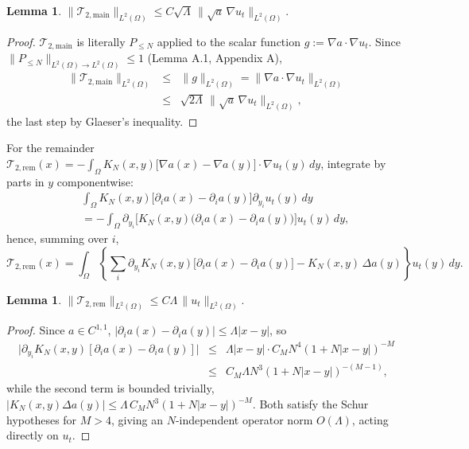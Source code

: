 \documentclass[11pt,letterpaper]{amsart}
\newtheorem{lemma}[theorem]{Lemma}
\newcommand{\Om}{\Omega}
\begin{document}
\begin{lemma}\label{lem:T2main}
$\displaystyle \|\mathcal T_{2,\mathrm{main}}\|_{L^2(\Om)} \le C\sqrt{\Lambda}\,\|\sqrt{a}\,\nabla u_t\|_{L^2(\Om)}.$
\end{lemma}
\begin{proof}
$\mathcal T_{2,\mathrm{main}}$ is literally $P_{\le N}$ applied to the scalar function $g:=\nabla a\cdot\nabla u_t$. Since $\|P_{\le N}\|_{L^2(\Om)\to L^2(\Om)}\le 1$ (Lemma A.1, Appendix A),
\begin{eqnarray*}
\|\mathcal T_{2,\mathrm{main}}\|_{L^2(\Om)} &\le& \|g\|_{L^2(\Om)} = \|\nabla a\cdot \nabla u_t\|_{L^2(\Om)}\\ 
&\le& \sqrt{2\Lambda}\,\|\sqrt{a}\,\nabla u_t\|_{L^2(\Om)},
\end{eqnarray*}
the last step by Glaeser's inequality.
\end{proof}

\noindent For the remainder $\mathcal T_{2,\mathrm{rem}}(x) = -\int_\Om K_N(x,y)\big[\nabla a(x)-\nabla a(y)\big]\cdot\nabla u_t(y)\,dy$, integrate by parts in $y$ componentwise:
\begin{eqnarray*}
&&\int_\Om K_N(x,y)\big[\partial_ia(x)-\partial_ia(y)\big]\partial_{y_i}u_t(y)\,dy\\
&& = -\int_\Om \partial_{y_i}\Big[K_N(x,y)\big(\partial_ia(x)-\partial_ia(y)\big)\Big]u_t(y)\,dy,
\end{eqnarray*}
hence, summing over $i$,
\[
\mathcal T_{2,\mathrm{rem}}(x) = \int_\Om \left\{\sum_i\partial_{y_i}K_N(x,y)\big[\partial_ia(x)-\partial_ia(y)\big] - K_N(x,y)\,\Delta a(y)\right\} u_t(y)\,dy.
\]

\begin{lemma}\label{lem:T2rem}
$\displaystyle \|\mathcal T_{2,\mathrm{rem}}\|_{L^2(\Om)} \le C\Lambda\,\|u_t\|_{L^2(\Om)}.$
\end{lemma}
\begin{proof}
Since $a\in C^{1,1}$, $|\partial_ia(x)-\partial_ia(y)|\le\Lambda|x-y|$, so
\begin{eqnarray*}
\big|\partial_{y_i}K_N(x,y)[\partial_ia(x)-\partial_ia(y)]\big| &\le& \Lambda|x-y|\cdot C_MN^4(1+N|x-y|)^{-M}\\ 
&\le& C_M\Lambda N^3(1+N|x-y|)^{-(M-1)},
\end{eqnarray*}
while the second term is bounded trivially, $|K_N(x,y)\Delta a(y)|\le \Lambda\,C_MN^3(1+N|x-y|)^{-M}$. Both satisfy the Schur hypotheses for $M>4$, giving an $N$-independent operator norm $O(\Lambda)$, acting directly on $u_t$.
\end{proof}
\end{document}
